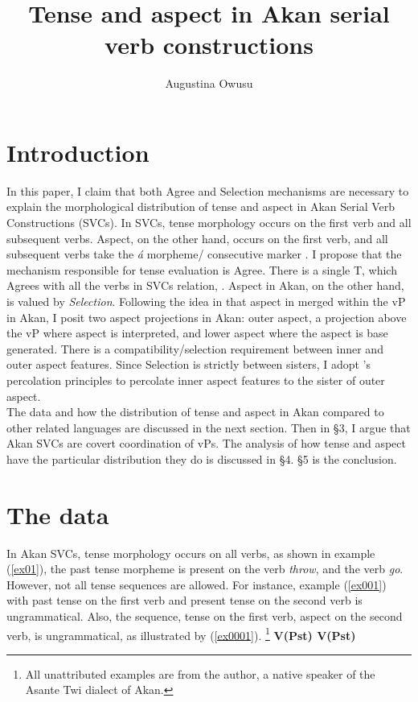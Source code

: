 \documentclass[output=paper,colorlinks,citecolor=brown]{langscibook}
\title{Tense and aspect in Akan serial verb constructions}
\author{Augustina Owusu\affiliation{Rutgers University}}
\begin{document}
\maketitle 

\section{Introduction}\label{sec:owusu:1}

In this paper, I claim that both Agree and Selection mechanisms are necessary to explain the morphological distribution of tense and aspect in Akan Serial Verb Constructions (SVCs). In SVCs, tense morphology occurs on the first verb and all subsequent verbs. Aspect, on the other hand, occurs on the first verb, and all subsequent verbs take the \emph{\'a} morpheme/ consecutive marker \citep{Dolphyne1996, Osam2003}. I propose that the mechanism responsible for tense evaluation is Agree. There is a single T, which Agrees with all the verbs in SVCs relation, \citep{PesetskyTorrego2007}.  Aspect in Akan, on the other hand, is valued by \emph{Selection}. Following the idea in \citet{Kandybowicz2010, Kandybowicz2015} that aspect in merged within the vP in Akan, I posit two aspect projections in Akan: outer aspect, a projection above the vP where aspect is interpreted, and lower aspect where the aspect is base generated.  There is a compatibility/selection requirement between inner and outer aspect features. Since Selection is strictly between sisters, I adopt \citet{Webelhuth1992}'s percolation principles to percolate inner aspect features to the sister of outer aspect.\\
The data and how the distribution of tense and aspect in Akan compared to other related languages are discussed in the next section. Then in \S3, I argue that Akan SVCs are covert coordination of vPs. The analysis of how tense and aspect have the particular distribution they do is discussed in \S4. \S5 is the conclusion.  

\section{The data}
In Akan SVCs, tense morphology occurs on all verbs, as shown in example (\ref{ex01}), the past tense morpheme is present on the verb \emph{throw}, and the verb \emph{go}. However, not all tense sequences are allowed. For instance, example (\ref{ex001}) with past tense on the first verb and present tense on the second verb is ungrammatical. Also, the sequence, tense on the first verb, aspect on the second verb, is ungrammatical, as illustrated by (\ref{ex0001}).  
\ea \label{ex0}
\footnote{All unattributed examples are from the author, a native speaker of the Asante Twi dialect of Akan. } 
\ea \textbf{V(Pst) \phantom {} {} {} V(Pst)}
\end{document}
